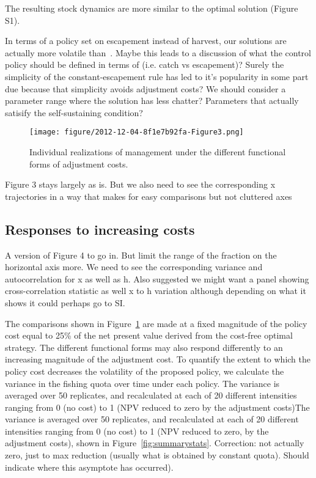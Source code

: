 \documentclass[authoryear, review, 12pt]{elsarticle}
\begin{document}
The resulting stock dynamics are more similar to the optimal solution (Figure S1).   

{\color{green} In terms of a policy set on escapement instead of harvest, our solutions are actually more volatile than~\citet{Reed1979}.  Maybe this leads to a discussion of what the control policy should be defined in terms of (i.e. catch vs escapement)?  Surely the simplicity of the constant-escapement rule has led to it's popularity in some part due because that simplicity avoids adjustment costs?  We should consider a parameter range where the solution has less chatter?  Parameters that actually satisify the \citet{Reed1979} self-sustaining condition?}

\begin{figure}
    \begin{center}
      \texttt{[image: figure/2012-12-04-8f1e7b92fa-Figure3.png]}
  \end{center}
  \caption{Individual realizations of management under the different functional forms of adjustment costs.} \label{fig:shapes}
\end{figure}

{\color{blue} 
  Figure 3 stays largely as is.  But we also need to see the corresponding x trajectories in a way that makes for easy comparisons but not cluttered axes
}

\subsection{Responses to increasing costs}


{\color{blue} 
 A version of Figure 4 to go in. But limit the range of the fraction on the horizontal axis more.  We need to see the corresponding variance and autocorrelation for x as well as h. Also suggested we might want a panel showing cross-correlation statistic as well x to h variation although depending on what it shows it could perhaps go to SI.
}


The comparisons shown in Figure~\ref{fig:shapes} are made at a fixed magnitude of the policy cost equal to 25\% of the net present value derived from the cost-free optimal strategy. The different functional forms may also respond differently to an increasing magnitude of the adjustment cost.  To quantify the extent to which the policy cost decreases the volatility of the proposed policy, we calculate the variance in the fishing quota over time under each policy. The variance is averaged over 50 replicates, and recalculated at each of 20 different intensities ranging from 0 (no cost) to 1 (NPV reduced to zero by the adjustment costs)The variance is averaged over 50 replicates, and recalculated at each of 20 different intensities ranging from 0 (no cost) to 1 (NPV reduced to zero, by the adjustment costs), shown in Figure~\ref{fig:summarystats}. {\color{green}Correction: not actually zero, just to max reduction (usually what is obtained by constant quota).  Should indicate where this asymptote has occurred)}. 
\end{document}
